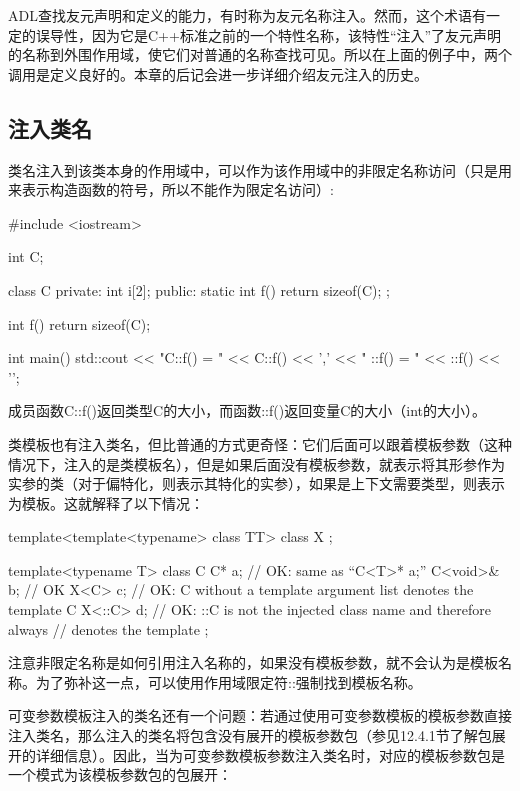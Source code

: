 ADL查找友元声明和定义的能力，有时称为友元名称注入。然而，这个术语有一定的误导性，因为它是C++标准之前的一个特性名称，该特性“注入”了友元声明的名称到外围作用域，使它们对普通的名称查找可见。所以在上面的例子中，两个调用是定义良好的。本章的后记会进一步详细介绍友元注入的历史。

\subsection{注入类名}

类名注入到该类本身的作用域中，可以作为该作用域中的非限定名称访问（只是用来表示构造函数的符号，所以不能作为限定名访问）:

\begin{cpp}
#include <iostream>

int C;

class C {
private:
	int i[2];
public:
	static int f() {
		return sizeof(C);
	}
};

int f() {
	return sizeof(C);
}

int main() {
	std::cout << "C::f() = " << C::f() << ','
	<< " ::f() = " << ::f() << '\n';
}
\end{cpp}

成员函数C::f()返回类型C的大小，而函数::f()返回变量C的大小（int的大小）。

类模板也有注入类名，但比普通的方式更奇怪：它们后面可以跟着模板参数（这种情况下，注入的是类模板名），但是如果后面没有模板参数，就表示将其形参作为实参的类（对于偏特化，则表示其特化的实参），如果是上下文需要类型，则表示为模板。这就解释了以下情况：

\begin{cpp}
template<template<typename> class TT> class X {};

template<typename T> class C {
	C* a; // OK: same as “C<T>* a;”
	C<void>& b; // OK
	X<C> c; // OK: C without a template argument list denotes the template C
	X<::C> d; // OK: ::C is not the injected class name and therefore always
			  // denotes the template
};
\end{cpp}

注意非限定名称是如何引用注入名称的，如果没有模板参数，就不会认为是模板名称。为了弥补这一点，可以使用作用域限定符::强制找到模板名称。

可变参数模板注入的类名还有一个问题：若通过使用可变参数模板的模板参数直接注入类名，那么注入的类名将包含没有展开的模板参数包（参见12.4.1节了解包展开的详细信息）。因此，当为可变参数模板参数注入类名时，对应的模板参数包是一个模式为该模板参数包的包展开：

